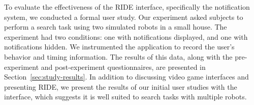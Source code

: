 To evaluate the effectiveness of the RIDE interface, specifically the notification system, we conducted a formal user study. Our experiment asked subjects to perform a search task using two simulated robots in a small house. The experiment had two conditions: one with notifications displayed, and one with notifications hidden. We instrumented the application to record the user’s behavior and timing information. The results of this data, along with the pre-experiment and post-experiment questionnaires, are presented in Section~\ref{sec:study-results}. In addition to discussing video game interfaces and presenting RIDE, we present the results of our initial user studies with the interface, which suggests it is well suited to search tasks with multiple robots.
